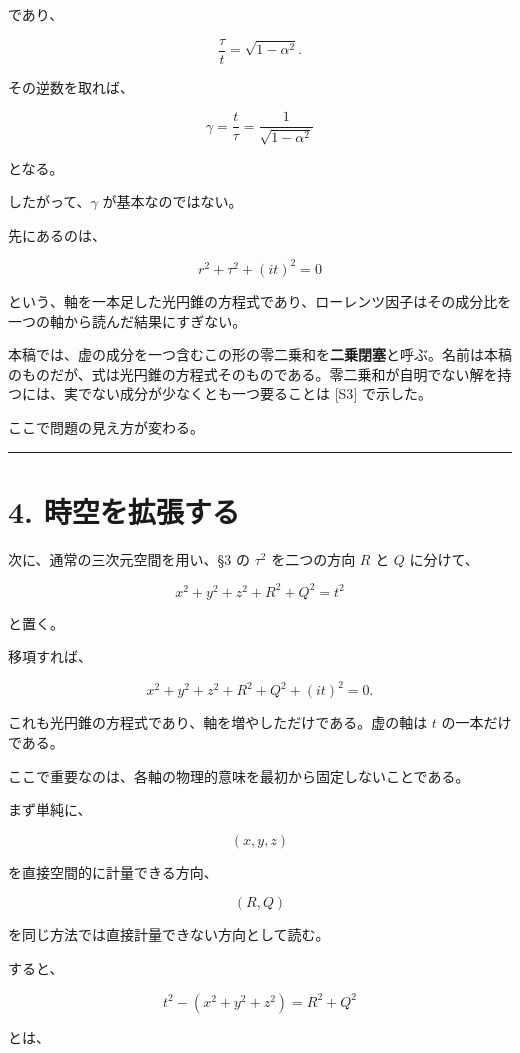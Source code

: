\documentclass[
  a4paper,
]{ltjsarticle}
\begin{document}
であり、

\[
\frac \tau t=\sqrt{1-\alpha^2}.
\]

その逆数を取れば、

\[
\gamma=\frac t\tau
=\frac1{\sqrt{1-\alpha^2}}
\]

となる。

したがって、\(\gamma\) が基本なのではない。

先にあるのは、

\[
\boxed{r^2+\tau^2+(it)^2=0}
\]

という、軸を一本足した光円錐の方程式であり、ローレンツ因子はその成分比を一つの軸から読んだ結果にすぎない。

本稿では、虚の成分を一つ含むこの形の零二乗和を\textbf{二乗閉塞}と呼ぶ。名前は本稿のものだが、式は光円錐の方程式そのものである。零二乗和が自明でない解を持つには、実でない成分が少なくとも一つ要ることは
{[}S3{]} で示した。

ここで問題の見え方が変わる。

\begin{center}\rule{0.5\linewidth}{0.5pt}\end{center}

\section{4.
時空を拡張する}\label{ux6642ux7a7aux3092ux62e1ux5f35ux3059ux308b}

次に、通常の三次元空間を用い、§3 の \(\tau^2\) を二つの方向 \(R\) と
\(Q\) に分けて、

\[
\boxed{
x^2+y^2+z^2+R^2+Q^2=t^2
}
\]

と置く。

移項すれば、

\[
x^2+y^2+z^2
+R^2+Q^2+(it)^2=0.
\]

これも光円錐の方程式であり、軸を増やしただけである。虚の軸は \(t\)
の一本だけである。

ここで重要なのは、各軸の物理的意味を最初から固定しないことである。

まず単純に、

\[
(x,y,z)
\]

を直接空間的に計量できる方向、

\[
(R,Q)
\]

を同じ方法では直接計量できない方向として読む。

すると、

\[
t^2-(x^2+y^2+z^2)
=
R^2+Q^2
\]

とは、
\end{document}
